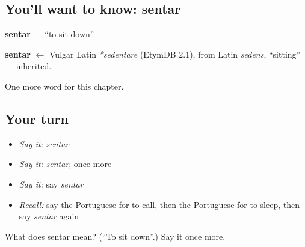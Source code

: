 \subsection*{You'll want to know: sentar}
\textbf{sentar} — \textquotedblleft{}to sit down\textquotedblright{}.

\begin{cousinweb}
\textbf{sentar} $\leftarrow$ Vulgar Latin \emph{*sedentare} (EtymDB 2.1), from Latin \emph{sedens}, \textquotedblleft{}sitting\textquotedblright{} — inherited.
\end{cousinweb}

\begin{grammarlens}[title={What you've built}]
One more word for this chapter.
\end{grammarlens}

\subsection*{Your turn}
\begin{itemize}
\raggedright
  \item \emph{Say it:} \emph{sentar}
  \item \emph{Say it:} \emph{sentar}, once more
  \item \emph{Say it:} say \emph{sentar}
  \item \emph{Recall:} say the Portuguese for to call, then the Portuguese for to sleep, then say \emph{sentar} again
\end{itemize}

\begin{tcolorbox}[breakable,colback=teal!4,colframe=teal!35!black,title={Before you move on}]
What does sentar mean? (\textquotedblleft{}To sit down\textquotedblright{}.) Say it once more.
\end{tcolorbox}
